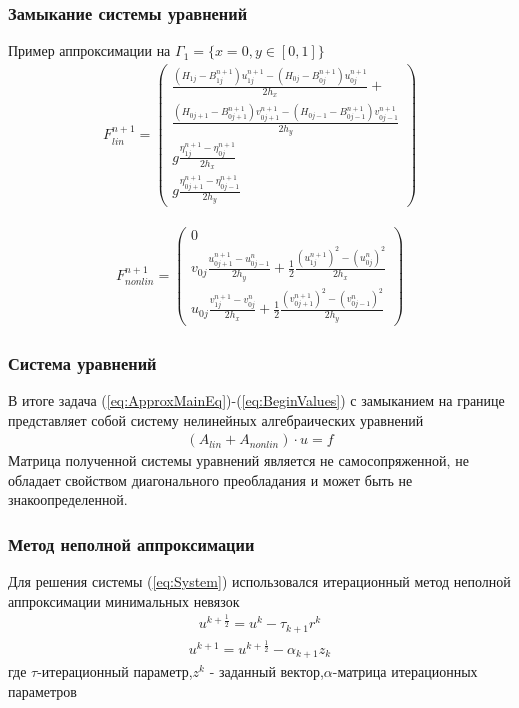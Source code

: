 \documentclass[14pt]{beamer}
\begin{document}
\begin{frame}
\frametitle{Замыкание системы уравнений}
Пример аппроксимации на $\Gamma_1=\{x=0,y\in[0,1]\}$
\begin{eqnarray}
\label{eq:ApproxFLinGamma1}
F^{n+1}_{lin}=\begin{pmatrix}
\frac{(H_{1j}-B_{1j}^{n+1})u_{1j}^{n+1}-(H_{0j}-B_{0j}^{n+1})u_{0j}^{n+1}}{2h_x}+\\
\frac{(H_{0j+1}-B_{0j+1}^{n+1})v_{0j+1}^{n+1}-(H_{0j-1}-B_{0j-1}^{n+1})v_{0j-1}^{n+1}}{2h_y}\\
g\frac{\eta_{1j}^{n+1}-\eta_{0j}^{n+1}}{2h_x}\\
g\frac{\eta_{0j+1}^{n+1}-\eta_{0j-1}^{n+1}}{2h_y}
\end{pmatrix}
\end{eqnarray}

\begin{eqnarray}
\label{eq:ApproxFNonlinGamma1}
F^{n+1}_{nonlin}=\begin{pmatrix}
0\\
v_{0j}\frac{u_{0j+1}^{n+1}-u_{0j-1}^{n}}{2h_y}+
\frac{1}{2}\frac{(u_{1j}^{n+1})^2-(u_{0j}^{n})^2}{2h_x}\\
u_{0j}\frac{v_{1j}^{n+1}-v_{0j}^{n}}{2h_x}+
\frac{1}{2}\frac{(v_{0j+1}^{n+1})^2-(v_{0j-1}^{n})^2}{2h_y}
\end{pmatrix}
\end{eqnarray}
\end{frame}

\begin{frame}
\frametitle{Система уравнений}
В итоге задача (\ref{eq:ApproxMainEq})-(\ref{eq:BeginValues}) с замыканием на границе представляет собой систему нелинейных алгебраических уравнений
\begin{eqnarray}
\label{eq:System}
(A_{lin} + A_{nonlin})\cdot u=f
\end{eqnarray}
Матрица полученной системы уравнений является не самосопряженной, не обладает свойством диагонального преобладания и может быть не знакоопределенной.
\end{frame}

\begin{frame}
\frametitle{Метод неполной аппроксимации}
Для решения системы (\ref{eq:System}) использовался итерационный метод неполной аппроксимации минимальных невязок
\begin{eqnarray}
\label{eq:Alg_first}
u^{k+\frac{1}{2}}=u^k-\tau_{k+1}r^k
\end{eqnarray}
\begin{eqnarray}
\label{eq:Alg_second}
u^{k+1}=u^{k+\frac{1}{2}}-\alpha_{k+1}z_k
\end{eqnarray}
где $\tau$-итерационный параметр,$z^k$ - заданный вектор,$\alpha$-матрица итерационных параметров
\end{frame}
\end{document}
